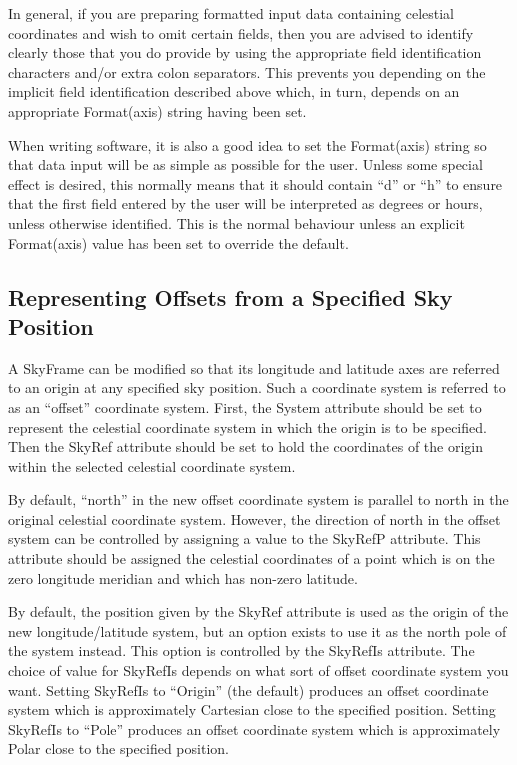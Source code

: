 \documentclass[twoside,11pt]{starlink}
\begin{document}
In general, if you are preparing formatted input data containing
celestial coordinates and wish to omit certain fields, then you are
advised to identify clearly those that you do provide by using the
appropriate field identification characters and/or extra colon
separators. This prevents you depending on the implicit field
identification described above which, in turn, depends on an
appropriate Format(axis) string having been set.

When writing software, it is also a good idea to set the Format(axis)
string so that data input will be as simple as possible for the
user. Unless some special effect is desired, this normally means that
it should contain ``d'' or ``h'' to ensure that the first field
entered by the user will be interpreted as degrees or hours, unless
otherwise identified. This is the normal behaviour unless an explicit
Format(axis) value has been set to override the default.

\subsection{Representing Offsets from a Specified Sky Position}
A SkyFrame can be modified so that its longitude and latitude axes are
referred to an origin at any specified sky position. Such a coordinate
system is referred to as an ``offset'' coordinate system. First, the System
attribute should be set to represent the celestial coordinate system in
which the origin is to be specified. Then the SkyRef attribute should be
set to hold the coordinates of the origin within the selected celestial
coordinate system.

By default, ``north'' in the new offset coordinate system is parallel to
north in the original celestial coordinate system. However, the direction
of north in the offset system can be controlled by assigning a value to
the SkyRefP attribute. This attribute should be assigned the celestial
coordinates of a point which is on the zero longitude meridian and which
has non-zero latitude.

By default, the position given by the SkyRef attribute is used as the
origin of the new longitude/latitude system, but an option exists to use
it as the north pole of the system instead. This option is controlled by
the SkyRefIs attribute. The choice of value for SkyRefIs depends on what
sort of offset coordinate system you want. Setting SkyRefIs to
``Origin'' (the default) produces an offset coordinate system which is
approximately Cartesian close to the specified position. Setting SkyRefIs
to
``Pole'' produces an offset coordinate system which is approximately Polar
close to the specified position.
\end{document}

